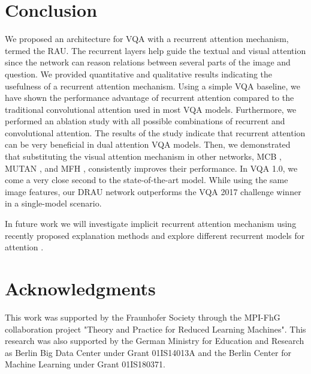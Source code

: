 \documentclass[times,twocolumn, final ,authoryear]{elsarticle}
\begin{document}
  \section{Conclusion}
  We proposed an architecture for VQA with a recurrent attention mechanism, termed the \acf{RAU}. The recurrent layers help guide the textual and visual attention since the network can reason relations between several parts of the image and question. We provided quantitative and qualitative results indicating the usefulness of a recurrent attention mechanism. Using a simple VQA baseline, we have shown the performance advantage of recurrent attention compared to the traditional convolutional attention used in most VQA models. Furthermore, we performed an ablation study with all possible combinations of recurrent and convolutional attention. The results of the study indicate that recurrent attention can be very beneficial in dual attention VQA models. 
  	Then, we demonstrated that substituting the visual attention mechanism in other networks, MCB \citep{fukui2016}, MUTAN \citep{ben-younes2017}, and MFH \citep{yu2017}, consistently improves their performance.  In VQA 1.0, we come a very close second to the state-of-the-art model. While using the same image features, our DRAU network outperforms the VQA 2017 challenge winner \cite{anderson2017} in a single-model scenario.
  
  In future work we will investigate implicit recurrent attention mechanism using recently proposed explanation methods \citep{ArrWASSA17, MonDSP18} and explore different recurrent models for attention \citep{kalchbrenner2015,shi2015}.
  
  \section*{Acknowledgments}
  This work was supported by the Fraunhofer Society through the MPI-FhG collaboration project "Theory and Practice for Reduced Learning Machines". This research was also supported by the German Ministry for Education and Research as Berlin Big Data Center under Grant 01IS14013A and the Berlin Center for Machine Learning under Grant 01IS180371.
  
  	
  	
  	
  	
%  	
  	
  	
  	
  
\end{document}
